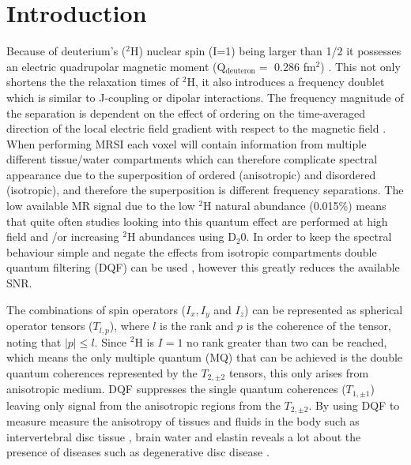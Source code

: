 \documentclass[class=article, crop=false]{standalone}
\begin{document}
 
\label{Chap:Quad}

\section{Introduction}

Because of deuterium's ($^2$H) nuclear spin (I=1) being larger than 1/2 it possesses an electric quadrupolar magnetic moment (Q$_{\text{deuteron}}=$ 0.286 fm$^2$)  \cite{Stone2015NuclearData}. This not only shortens the the relaxation times of $^2$H, it also introduces a frequency doublet which is similar to J-coupling or dipolar interactions. The frequency magnitude of the separation is dependent on the effect of ordering on the time-averaged direction of the local electric field gradient with respect to the magnetic field \cite{Seelig1977DeuteriumMembranes, Eliav2016MultipleMRS}. When performing MRSI each voxel will contain information from multiple different tissue/water compartments which can therefore complicate spectral appearance due to the superposition of ordered (anisotropic) and disordered (isotropic), and therefore the superposition is different frequency separations. The low available MR signal due to the low $^2$H natural abundance (0.015\%) means that quite often studies looking into this quantum effect are performed at high field  \cite{Gursan2022ResidualMuscle} and \cite{Ooms2015DoubleTissue}/or \cite{Damion2022DoubleLoading} increasing $^2$H abundances using D$_2$0. In order to keep the spectral behaviour simple and negate the effects from isotropic compartments double quantum filtering (DQF) can be used \cite{Sharf1995DetectionNMR-Spectroscopy, Perea20072HDisc}, however this greatly reduces the available SNR. 

The combinations of spin operators ($I_x, I_y$ and $I_z$) can be represented as spherical operator tensors ($T_{l,p}$), where $l$ is the rank and $p$ is the coherence of the tensor, noting that $|p| \le l$. Since $^2$H is $I=1$ no rank greater than two can be reached, which means the only multiple quantum (MQ) that can be achieved is the double quantum coherences represented by the $T_{2,\pm2}$ tensors, this only arises from anisotropic medium. DQF suppresses the single quantum coherences ($T_{1,\pm1}$) leaving only signal from the anisotropic regions from the $T_{2,\pm2}$. By using DQF to measure measure the anisotropy of tissues and fluids in the body such as intervertebral disc tissue  \cite{Ooms2015DoubleTissue}, brain water \cite{Assaf1997InSpectroscopy} and elastin \cite{Sun2010InvestigationNMR} reveals a lot about the presence of diseases such as degenerative disc disease \cite{Ooms2015DoubleTissue}.
\end{document}
